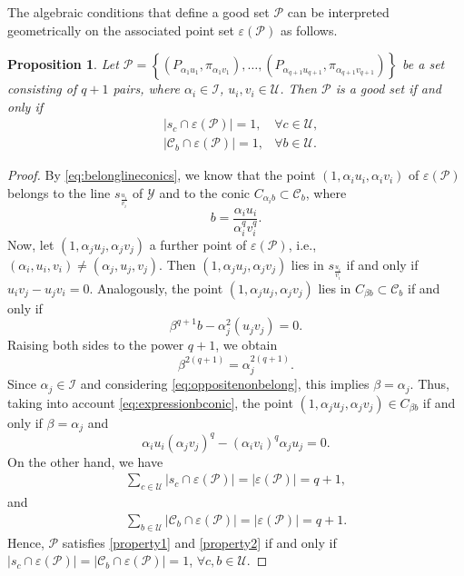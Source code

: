 \documentclass[11pt]{article}
\newtheorem{prop}[theorem]{Proposition}
\theoremstyle{definition}
\numberwithin{equation}{section}
\def\eps{\varepsilon}
\def\cC{\mathscr C}
\def\cI{\mathcal I}
\def\cP{\mathcal P}
\def\cU{\mathcal U}
\def\cY{\mathcal Y}
\begin{document}
The algebraic conditions that define a good set $\mathcal{P}$ can be interpreted geometrically on the associated point set $\eps(\mathcal{P})$ as follows.

\begin{prop} \label{prop3}
Let $\cP = \left\{\left(P_{\alpha_{1} u_1}, \pi_{\alpha_{1} v_1}\right), \dots, \left(P_{\alpha_{{q+1}} u_{q+1}}, \pi_{\alpha_{{q+1}} v_{q+1}}\right)\right\}$ be a set consisting of $q+1$ pairs, where $\alpha_{i} \in \cI$, $u_i, v_i \in \cU$. Then $\cP$ is a good set if and only if 
\begin{align}
    & |s_c \cap \eps(\cP)| = 1, & \forall c \in \cU, \label{prope1} \\
    & |\cC_{b} \cap \eps(\cP)| = 1, & \forall b \in \cU. \label{prope2}
\end{align}
\end{prop}
\begin{proof}
By \eqref{eq:belonglineconics}, we know that the point $(1, \alpha_{i} u_i, \alpha_{i} v_i)$ of $\eps(\cP)$ belongs to the line $s_{\frac{u_i}{v_i}}$ of $\cY$ and to the conic $C_{\alpha_{i} b} \subset \cC_b$, where 
\begin{equation} \label{eq:expressionbconic}
b = \frac{\alpha_{i} u_i}{\alpha_{i}^q v_i^q}.
\end{equation}
Now, let $(1, \alpha_{j} u_{j}, \alpha_{j} v_{j})$ a further point of $\eps(\cP)$, i.e., $\left(\alpha_{i}, u_i, v_i\right) \ne \left( \alpha_{j}, u_{j}, v_{j} \right)$. Then $(1, \alpha_{j} u_{j}, \alpha_{j} v_{j})$ lies in $s_{\frac{u_i}{v_i}}$ if and only if $u_i v_{j} - u_{j} v_i = 0$. Analogously, the point $(1, \alpha_{j} u_{j}, \alpha_{j} v_{j})$ lies in $C_{\beta b} \subset \cC_b$ if and only if
\[
\beta^{q+1} b - \alpha_j^2(u_j v_j) = 0.
\]
Raising both sides to the power $q+1$, we obtain
\[
\beta^{2(q+1)} = \alpha_j^{2(q+1)}.
\]
Since $\alpha_j \in \mathcal{I}$ and considering \eqref{eq:oppositenonbelong}, this implies $\beta = \alpha_j$. Thus, taking into account \eqref{eq:expressionbconic}, the point $(1, \alpha_{j} u_{j}, \alpha_{j} v_{j}) \in C_{\beta b}$ if and only if $\beta = \alpha_j$ and 
\[
\alpha_{i} u_i (\alpha_{j} v_{j})^q - (\alpha_{i} v_i)^q \alpha_{j} u_{j} = 0.
\]
On the other hand, we have 
    \begin{align*}
        \sum_{c \in \cU} \lvert s_c \cap \eps(\mathcal{P})\rvert = \lvert \eps(\mathcal{P})\rvert =q+1,
    \end{align*}
and 
    \begin{align*}
        \sum_{b \in \cU} \lvert \cC_b \cap \eps(\mathcal{P})\rvert = \lvert \eps(\mathcal{P})\rvert =q+1.
    \end{align*}
    Hence, $\cP$ satisfies \eqref{property1} and \eqref{property2} if and only if $|s_c \cap \eps(\cP)| = |\cC_b \cap \eps(\cP)| = 1$, $\forall c,b \in \cU$.
\end{proof}
\end{document}
